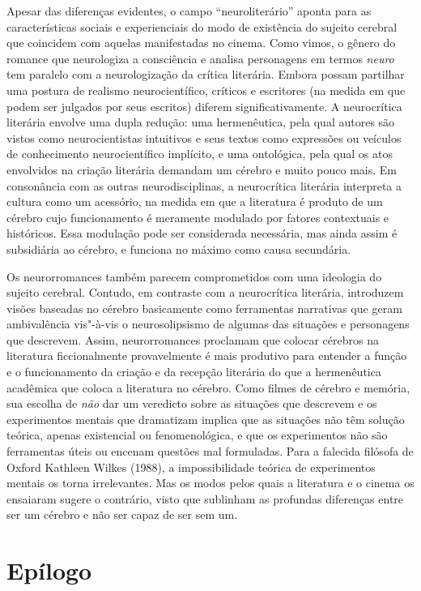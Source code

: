 Apesar das diferenças evidentes, o campo ``neuroliterário'' aponta para
as características sociais e experienciais do modo de existência do
sujeito cerebral que coincidem com aquelas manifestadas no cinema. Como
vimos, o gênero do romance que neurologiza a consciência e analisa
personagens em termos \emph{neuro} tem paralelo com a neurologização da
crítica literária. Embora possam partilhar uma postura de realismo
neurocientífico, críticos e escritores (na medida em que podem ser
julgados por seus escritos) diferem significativamente. A neurocrítica
literária envolve uma dupla redução: uma hermenêutica, pela qual autores
são vistos como neurocientistas intuitivos e seus textos como expressões
ou veículos de conhecimento neurocientífico implícito, e uma ontológica,
pela qual os atos envolvidos na criação literária demandam um cérebro e
muito pouco mais. Em consonância com as outras neurodisciplinas, a
neurocrítica literária interpreta a cultura como um acessório, na medida
em que a literatura é produto de um cérebro cujo funcionamento é
meramente modulado por fatores contextuais e históricos. Essa modulação
pode ser considerada necessária, mas ainda assim é subsidiária ao
cérebro, e funciona no máximo como causa secundária.

Os neurorromances também parecem comprometidos com uma ideologia do
sujeito cerebral. Contudo, em contraste com a neurocrítica literária,
introduzem visões baseadas no cérebro basicamente como ferramentas
narrativas que geram ambivalência vis"-à-vis o neurosolipsismo de algumas
das situações e personagens que descrevem. Assim, neurorromances
proclamam que colocar cérebros na literatura ficcionalmente
provavelmente é mais produtivo para entender a função e o funcionamento
da criação e da recepção literária do que a hermenêutica acadêmica que
coloca a literatura no cérebro. Como filmes de cérebro e memória, sua
escolha de \emph{não} dar um veredicto sobre as situações que descrevem
e os experimentos mentais que dramatizam implica que as situações não
têm solução teórica, apenas existencial ou fenomenológica, e que os
experimentos não são ferramentas úteis ou encenam questões mal
formuladas. Para a falecida filósofa de Oxford Kathleen Wilkes (1988), a
impossibilidade teórica de experimentos mentais os torna irrelevantes.
Mas os modos pelos quais a literatura e o cinema os ensaiaram sugere o
contrário, visto que sublinham as profundas diferenças entre ser um
cérebro e não ser capaz de ser sem um.

\chapter{Epílogo}

